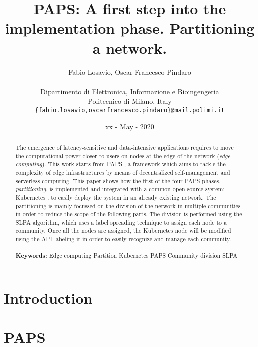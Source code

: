 \documentclass{article} %
\title{\textbf{\huge{PAPS: A first step into the implementation phase. Partitioning a network.}}}
\author{\color{black}Fabio Losavio, Oscar Francesco Pindaro \\ \\
        Dipartimento di Elettronica, Informazione e Bioingengeria \\
        Politecnico di Milano, Italy \\
        \texttt{\{fabio.losavio,oscarfrancesco.pindaro\}@mail.polimi.it}}
\date{xx - May - 2020}
\begin{document}
\maketitle

\begin{abstract}
    The emergence of latency-sensitive and data-intensive applications requires to move the 
    computational power closer to users on nodes at the edge of the network (\textit{edge computing}).
    This work starts from PAPS \cite{PAPS}, a framework which aims to tackle the complexity of edge 
    infrastructures by means of decentralized self-management and serverless computing. This paper
    shows how the first of the four PAPS phases, \textit{partitioning}, is implemented and integrated
    with a common open-source system: Kubernetes \cite{Kube}, to easily deploy the system in an already
    existing network. The partitioning is mainly focussed on the division of the network in multiple 
    communities in order to reduce the scope of the following parts. The division is performed using 
    the SLPA \cite{SLPA} algorithm, which uses a label spreading technique to assign each node to a
    community. Once all the nodes are assigned, the Kubernetes node will be modified using the API 
    labeling it in order to easily recognize and manage each community.
    \\ \\
    \textbf{Keywords:} Edge computing \textbf{\textperiodcentered} Partition 
    \textbf{\textperiodcentered} Kubernetes \textbf{\textperiodcentered} PAPS
    \textbf{\textperiodcentered} Community division \textbf{\textperiodcentered} SLPA
    
\end{abstract}
{{\section{Introduction}\label{sect:intro}}}


\clearpage
{{\section{PAPS}\label{sect:paps}}}

\end{document}
